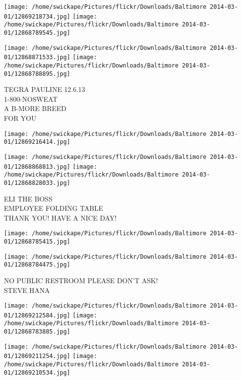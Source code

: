 \documentclass[10pt,letterpaper]{article}
\begin{document}
\texttt{[image: /home/swickape/Pictures/flickr/Downloads/Baltimore 2014-03-01/12869218734.jpg]}
\texttt{[image: /home/swickape/Pictures/flickr/Downloads/Baltimore 2014-03-01/12868789545.jpg]}

\texttt{[image: /home/swickape/Pictures/flickr/Downloads/Baltimore 2014-03-01/12868871533.jpg]}
\texttt{[image: /home/swickape/Pictures/flickr/Downloads/Baltimore 2014-03-01/12868788895.jpg]}

TEGRA PAULINE 12.6.13\\
1{-}800{-}NOSWEAT\\
A B{-}MORE BREED\\
FOR YOU\\
\pagebreak

\texttt{[image: /home/swickape/Pictures/flickr/Downloads/Baltimore 2014-03-01/12869216414.jpg]}

\vspace{0.25in}
\texttt{[image: /home/swickape/Pictures/flickr/Downloads/Baltimore 2014-03-01/12868868813.jpg]}
\texttt{[image: /home/swickape/Pictures/flickr/Downloads/Baltimore 2014-03-01/12868828033.jpg]}

ELI THE BOSS\\
EMPLOYEE FOLDING TABLE\\
THANK YOU!  HAVE A NICE DAY!\\
\pagebreak

\texttt{[image: /home/swickape/Pictures/flickr/Downloads/Baltimore 2014-03-01/12868785415.jpg]}

\vspace{0.25in}
\texttt{[image: /home/swickape/Pictures/flickr/Downloads/Baltimore 2014-03-01/12868784475.jpg]}

NO PUBLIC RESTROOM PLEASE DON'T ASK!\\
STEVE HANA\\
\pagebreak

\texttt{[image: /home/swickape/Pictures/flickr/Downloads/Baltimore 2014-03-01/12869212584.jpg]}
\texttt{[image: /home/swickape/Pictures/flickr/Downloads/Baltimore 2014-03-01/12868783885.jpg]}

\texttt{[image: /home/swickape/Pictures/flickr/Downloads/Baltimore 2014-03-01/12869211254.jpg]}
\texttt{[image: /home/swickape/Pictures/flickr/Downloads/Baltimore 2014-03-01/12869210534.jpg]}
\end{document}
